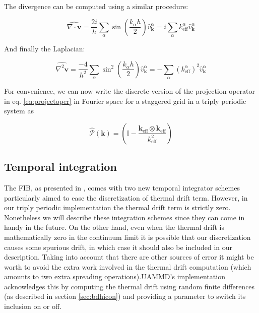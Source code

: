 \documentclass[ twoside,openright,titlepage,numbers=noenddot,%
headinclude,footinclude,cleardoublepage=empty,abstract=on,
BCOR=5mm,paper=a4,fontsize=11pt, dvipsnames
]{scrreprt}
\renewcommand{\vec}[1]{\bm{#1}}
\newcommand{\oper}[1]{\mathcal{#1}}
\newcommand{\uammd}{\gls{UAMMD}\xspace}
\newcommand{\fou}[1]{\widehat{#1}}
\begin{document}
The divergence can be computed using a similar procedure:

\begin{equation}
  \label{eq:staggereddivfou}
  \fou{\nabla\cdot\vec{v}} = \frac{2i}{h}\sum_\alpha\sin\left(\frac{k_\alpha h}{2}\right)\fou{v}_{\vec{k}}^\alpha = i \sum_\alpha k^\alpha_{\text{eff}}\fou{v}_{\vec{k}}^\alpha
\end{equation}

And finally the Laplacian:

\begin{equation}
  \label{eq:staggeredlapfou}
  \fou{\nabla^2\vec{v}} = \frac{-4}{h^2}\sum_\alpha\sin^2\left(\frac{k_\alpha h}{2}\right)\fou{v}_{\vec{k}}^\alpha = -\sum_\alpha \left(k^\alpha_{\text{eff}}\right)^2\fou{v}_{\vec{k}}^\alpha
\end{equation}

For convenience, we can now write the discrete version of the projection operator in eq. \eqref{eq:projectoper} in Fourier space for a staggered grid in a triply periodic system as

\begin{equation}
  \label{eq:staggeredprojection}
  \fou{\oper{P}}(\vec{k}) = \left(\mathbb{I} - \frac{\vec{k}_{\text{eff}}\otimes\vec{k}_{\text{eff}}}{k_{\text{eff}}^2}\right)
\end{equation}
\subsection*{Temporal integration}
The \gls{FIB}, as presented in \cite{Delong2014}, comes with two new temporal integrator schemes particularly aimed to ease the discretization of thermal drift term. However, in our triply periodic implementation the thermal drift term is strictly zero. Nonetheless we will describe these integration schemes since they can come in handy in the future. On the other hand, even when the thermal drift is mathematically zero in the continuum limit it is possible that our discretization causes some spurious drift, in which case it should also be included in our description.
Taking into account that there are other sources of error it might be worth to avoid the extra work involved in the thermal drift computation (which amounts to two extra spreading operations).\uammd's implementation acknowledges this by computing the thermal drift using random finite differences (as described in section \ref{sec:bdhicon}) and providing a parameter to switch its inclusion on or off.
\end{document}
